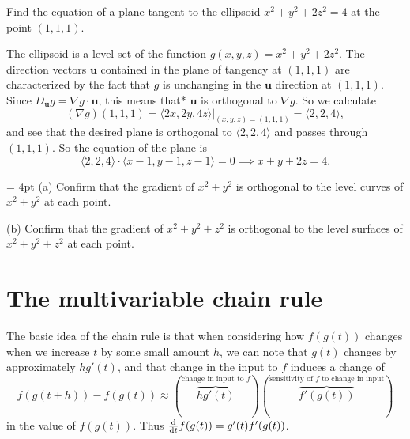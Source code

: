 \documentclass{watsonbook}
\begin{document}
\begin{example}{}{}
  Find the equation of a plane tangent to the ellipsoid $x^2 + y^2 +
  2z^2  = 4$ at the point $(1,1,1)$. 
\end{example}

\begin{solution}
  The ellipsoid is a level set of the function
  $g(x,y,z) = x^2 + y^2 + 2z^2$. The direction vectors $\mathbf{u}$
  contained in the plane of tangency at $(1,1,1)$ are characterized
  by the fact that $g$ is unchanging in the $\mathbf{u}$
  direction at $(1,1,1)$. Since
  $D_{\mathbf{u}}g = \nabla g \cdot \mathbf{u}$, this means that*
  $\mathbf{u}$ is orthogonal to $\nabla g$. So we calculate
  \[
    (\nabla g)(1,1,1) = \left.\langle 2x, 2y, 4z \rangle\right|_{(x,y,z) =
      (1,1,1)} = \langle 2, 2, 4 \rangle, 
  \]
  and see that the desired plane is orthogonal to $\langle 2, 2, 4
  \rangle$ and passes through $(1,1,1)$. So the equation of the
  plane is 
  \[
    \langle 2, 2, 4 \rangle \cdot \langle x - 1, y - 1, z - 1
    \rangle = 0 \implies \boxed{x + y + 2z = 4}. 
  \]
\end{solution}

  \begin{exercise}{}{} \parskip = 4pt 
    (a) Confirm that the gradient of $x^2 + y^2$ is orthogonal to the level
    curves of $x^2 + y^2$ at each point.

    (b) Confirm that the gradient of
    $x^2 + y^2 + z^2 $ is orthogonal to the level surfaces of
    $x^2 + y^2 + z^2$ at each point.
  \end{exercise}

  \section{The multivariable chain rule} \label{sec:chainrule} 


  The basic idea of the chain rule is that when considering how
  $f(g(t))$ changes when we increase $t$ by some small amount $h$, we
  can note that $g(t)$ changes by approximately $hg'(t)$, and that
  change in the input to $f$ induces a change of
  \[
    f(g(t+h)) - f(g(t)) \approx \left(
      \overbrace{hg'(t)}^{\text{change in input to $f$}} 
    \right) \left( 
    \overbrace{f'(g(t))}^{\text{sensitivity of
        $f$ to change in input}}
    \right) 
  \]
  in the value of $f(g(t))$. Thus $\tfrac{\mathrm{d}}{\mathrm{d} t} f(g(t)) =
  g'(t)f'(g(t))$. 
\end{document}
